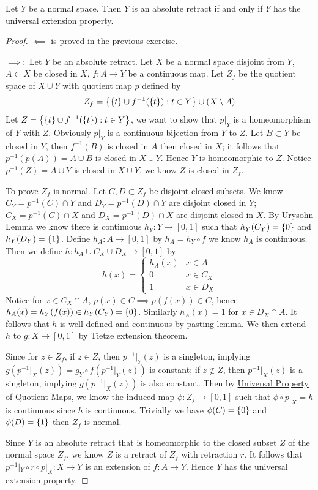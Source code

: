 \documentclass[12pt,a4paper]{article}
\begin{document}
    \begin{ex}
        Let $Y$ be a normal space. Then $Y$ is an absolute retract if and only if $Y$ has the universal extension property.
    \end{ex}
    \begin{proof}
        $\impliedby$ is proved in the previous exercise.

        $\implies:$ Let $Y$ be an absolute retract. Let $X$ be a normal space disjoint from $Y$, $A\subset X$ be closed in $X$, $f:A\to Y$ be a continuous map. Let $Z_f$ be the quotient space of $X\cup Y$ with quotient map $p$ defined by
        $$
        Z_f=\left\{\left\{t\right\}\cup f^{-1}(\left\{t\right\}):t\in Y\right\}\cup (X\setminus A)
        $$
        Let $Z=\left\{\left\{t\right\}\cup f^{-1}(\left\{t\right\}):t\in Y\right\}$, we want to show that $p|_Y$ is a homeomorphism of $Y$ with $Z$. Obviously $p|_Y$ is a continuous bijection from $Y$ to $Z$. Let $B\subset Y$ be closed in $Y$, then $f^{-1}(B)$ is closed in $A$ then closed in $X$; it follows that $p^{-1}(p(A))=A\cup B$ is closed in $X\cup Y$. Hence $Y$ is homeomorphic to $Z$. Notice $p^{-1}(Z)=A\cup Y$ is closed in $X\cup Y$, we know $Z$ is closed in $Z_f$.
        
        To prove $Z_f$ is normal. Let $C,D\subset Z_f$ be disjoint closed subsets. We know $C_Y=p^{-1}(C)\cap Y$ and $D_Y=p^{-1}(D)\cap Y$ are disjoint closed in $Y$; $C_X=p^{-1}(C)\cap X$ and $D_X=p^{-1}(D)\cap X$ are disjoint closed in $X$. By Urysohn Lemma we know there is continuous $h_Y:Y\to[0,1]$ such that $h_Y(C_Y)=\left\{0\right\}$ and $h_Y(D_Y)=\left\{1\right\}$. Define $h_A:A\to [0,1]$ by $h_A=h_Y\circ f$ we know $h_A$ is continuous. Then we define $h:h_A\cup C_X\cup D_X\to [0,1]$ by
        $$
        h(x)=\begin{cases}
            h_A(x)&x\in A\\
            0&x\in C_X\\
            1&x\in D_X
        \end{cases}
        $$
        Notice for $x\in C_X\cap A$, $p(x)\in C\implies p(f(x))\in C$, hence $h_A(x)=h_Y(f(x))\in h_Y(C_Y)=\left\{0\right\}$. Similarly $h_A(x)=1$ for $x\in D_X\cap A$. It follows that $h$ is well-defined and continuous by pasting lemma. We then extend $h$ to $g:X\to [0,1]$ by Tietze extension theorem.

        Since for $z\in Z_f$, if $z\in Z$, then $p^{-1}|_Y(z)$ is a singleton, implying $g(p^{-1}|_X(z))=g_Y\circ f(p^{-1}|_Y(z))$ is constant; if $z\notin Z$, then $p^{-1}|_X(z)$ is a singleton, implying $g(p^{-1}|_X(z))$ is also constant. Then by \hyperref[2.10.7]{Universal Property of Quotient Maps}, we know the induced map $\phi:Z_f\to[0,1]$ such that $\phi\circ p|_X=h$ is continuous since $h$ is continuous. Trivially we have $\phi(C)=\left\{0\right\}$ and $\phi(D)=\left\{1\right\}$ then $Z_f$ is normal.

        Since $Y$ is an absolute retract that is homeomorphic to the closed subset $Z$ of the normal space $Z_f$, we know $Z$ is a retract of $Z_f$ with retraction $r$. It follows that $p^{-1}|_Y\circ r\circ p|_X:X\to Y$ is an extension of $f:A\to Y$. Hence $Y$ has the universal extension property.
    \end{proof}
\end{document}
